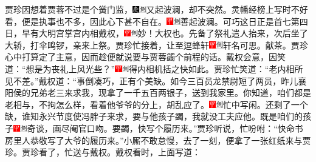 贾珍因想着贾蓉不过是个黉门监，{\includegraphics[width=3mm]{../Images/00004}\includegraphics[width=3mm]{../Images/00011}\footnotesize \kaishu 又起波澜，却不突然。}灵幡经榜上写时不好看，便是执事也不多，因此心下甚不自在。{\includegraphics[width=3mm]{../Images/00002}\includegraphics[width=3mm]{../Images/00011}\footnotesize \kaishu 善起波澜。}可巧这日正是首七第四日，早有大明宫掌宫内相戴权，{\includegraphics[width=3mm]{../Images/00002}\includegraphics[width=3mm]{../Images/00011}\footnotesize \kaishu 妙！大权也。}先备了祭礼遣人抬来，次后坐了大轿，打伞鸣锣，亲来上祭。贾珍忙接着，让至逗蜂轩{\includegraphics[width=3mm]{../Images/00002}\includegraphics[width=3mm]{../Images/00011}\footnotesize \kaishu 轩名可思。}献茶。贾珍心中打算定了主意，因而趁便就说要与贾蓉蠲个前程的话。戴权会意，因笑道：``想是为丧礼上风光些？''{\includegraphics[width=3mm]{../Images/00002}\includegraphics[width=3mm]{../Images/00011}\footnotesize \kaishu 得内相机括之快如此。}贾珍忙笑道：``老内相所见不差。''戴权道：``事倒凑巧，正有个美缺。如今三百员龙禁尉短了两员，昨儿襄阳侯的兄弟老三来求我，现拿了一千五百两银子，送到我家里。你知道，咱们都是老相与，不拘怎么样，看着他爷爷的分上，胡乱应了。{\includegraphics[width=3mm]{../Images/00002}\includegraphics[width=3mm]{../Images/00011}\footnotesize \kaishu 忙中写闲。}还剩了一个缺，谁知永兴节度使冯胖子来求，要与他孩子蠲，我就没工夫应他。既是咱们的孩子{\includegraphics[width=3mm]{../Images/00002}\includegraphics[width=3mm]{../Images/00011}\footnotesize \kaishu 奇谈，画尽阉官口吻。}要蠲，快写个履历来。''贾珍听说，忙吩咐：``快命书房里人恭敬写了大爷的履历来。''小厮不敢怠慢，去了一刻，便拿了一张红纸来与贾珍。贾珍看了，忙送与戴权。戴权看时，上面写道：

